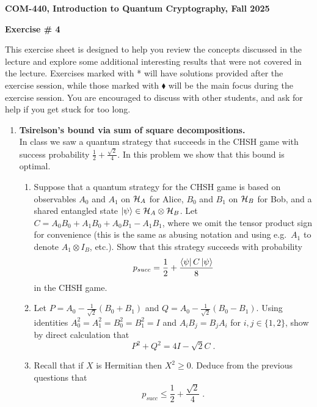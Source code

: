 \documentclass[12pt]{article}
\newcommand{\header}[1]{\begin{center} {\large\bf #1} \end{center}}
\begin{document}
\header{COM-440, Introduction to Quantum Cryptography, Fall 2025}
\header{\bf Exercise \# 4}

This exercise sheet is designed to help you review the concepts discussed in the lecture and explore some additional interesting results that were not covered in the lecture. Exercises marked with * will have solutions provided after the exercise session, while those marked with $\blacklozenge$ will be the main focus during the exercise session. You are encouraged to discuss with other students, and ask for help if you get stuck for too long.

\begin{enumerate}
\item \textbf{Tsirelson's bound via sum of square decompositions. }\\
In class we saw a quantum strategy that succeeds in the CHSH game with success probability $\frac12+\frac{\sqrt{2}}{4}$. In this problem we show that this bound is optimal. 
\begin{enumerate}
\item Suppose that a quantum strategy for the CHSH game is based on observables $A_0$ and $A_1$ on $\mathcal{H}_A$ for Alice, $B_0$ and $B_1$ on $\mathcal{H}_B$ for Bob, and a shared entangled state $\ket{\psi}\in \mathcal{H}_A\otimes \mathcal{H}_B$. Let $C = A_0B_0 + A_1B_0 + A_0B_1-A_1B_1$, where we omit the tensor product sign for convenience (this is the same as abusing notation and using e.g.\ $A_1$ to denote $A_1 \otimes I_B$, etc.). Show that this strategy succeeds with probability 
\begin{equation}\label{eq:ps}
 p_{succ} = \frac{1}{2} + \frac{\bra{\psi} C \ket{\psi}}{8} 
\end{equation}
in the CHSH game. 
\item Let $P = A_0 - \frac{1}{\sqrt{2}}(B_0+B_1)$ and $Q= A_0 - \frac{1}{\sqrt{2}}(B_0-B_1)$. Using identities $A_0^2=A_1^2=B_0^2=B_1^2=I$ and $A_iB_j=B_jA_i$ for $i,j\in\{1,2\}$, show by direct calculation that 
\[P^2 + Q^2 = 4I - \sqrt{2}C\;.\]
\item Recall that if $X$ is Hermitian then $X^2 \geq 0$. Deduce from the previous questions that 
\[ p_{succ} \leq \frac12+\frac{\sqrt{2}}{4}\;.\]
\end{enumerate}


\end{enumerate}
\end{document}
